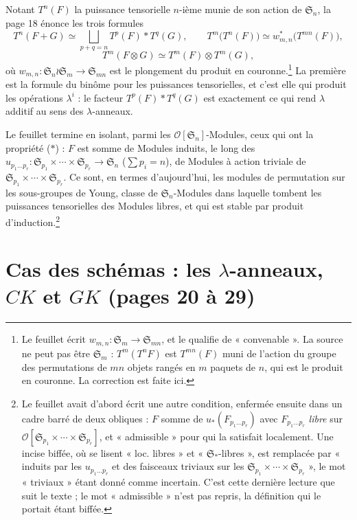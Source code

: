 \documentclass[11pt,a4paper]{article}
\begin{document}
Notant $T^{n}(F)$ la puissance tensorielle $n$-ième munie de son action de
$\mathfrak{S}_{n}$, la page 18 énonce les trois formules
\[
  T^{n}(F + G) \simeq \bigsqcup_{p+q=n} T^{p}(F) \ast T^{q}(G),
  \qquad
  T^{m}\bigl(T^{n}(F)\bigr) \simeq w_{m,n}^{*}\bigl(T^{mn}(F)\bigr),
\]
\[
  T^{m}(F \otimes G) \simeq T^{m}(F) \otimes T^{m}(G),
\]
où $w_{m,n} : \mathfrak{S}_{n} \wr \mathfrak{S}_{m} \to \mathfrak{S}_{mn}$ est
le plongement du produit en couronne.\footnote{Le feuillet écrit $w_{m,n} :
\mathfrak{S}_{m} \to \mathfrak{S}_{mn}$, et le qualifie de « convenable ». La source ne peut pas être $\mathfrak{S}_{m}$ :
$T^{m}(T^{n}F)$ est $T^{mn}(F)$ muni de l'action du groupe des permutations de
$mn$ objets rangés en $m$ paquets de $n$, qui est le produit en couronne. La
correction est faite ici.} La première est la formule du binôme pour les
puissances tensorielles, et c'est elle qui produit les opérations
$\lambda^{i}$ : le facteur $T^{p}(F) \ast T^{q}(G)$ est exactement ce qui
rend $\lambda$ additif au sens des $\lambda$-anneaux.

Le feuillet termine en isolant, parmi les $\mathcal{O}[\mathfrak{S}_{n}]$-Modules,
ceux qui ont la propriété ($\ast$) : $F$ est somme de Modules induits, le
long des $u_{p_{1} \ldots p_{r}} : \mathfrak{S}_{p_{1}} \times \cdots \times
\mathfrak{S}_{p_{r}} \to \mathfrak{S}_{n}$ ($\sum p_{i} = n$), de Modules à
action triviale de $\mathfrak{S}_{p_{1}} \times \cdots \times
\mathfrak{S}_{p_{r}}$. Ce sont, en termes d'aujourd'hui, les modules de
permutation sur les sous-groupes de Young, classe de $\mathfrak{S}_{n}$-Modules
dans laquelle tombent les puissances tensorielles des Modules libres, et qui
est stable par produit d'induction.\footnote{Le feuillet avait d'abord écrit une autre condition,
enfermée ensuite dans un cadre barré de deux obliques : $F$ somme de
$u_{*}(F_{p_{1} \ldots p_{r}})$ avec $F_{p_{1} \ldots p_{r}}$ \emph{libre} sur
$\mathcal{O}[\mathfrak{S}_{p_{1}} \times \cdots \times \mathfrak{S}_{p_{r}}]$,
et « admissible » pour qui la satisfait localement. Une incise biffée, où se
lisent « loc. libres » et « $\mathfrak{S}_{*}$-libres », est remplacée par
« induits par les $u_{p_{1} \ldots p_{r}}$ et des faisceaux triviaux sur les
$\mathfrak{S}_{p_{1}} \times \cdots \times \mathfrak{S}_{p_{r}}$ », le mot
« triviaux » étant donné comme incertain. C'est cette dernière lecture que
suit le texte ; le mot « admissible » n'est pas repris, la définition qui le
portait étant biffée.}

\section*{Cas des schémas : les $\lambda$-anneaux, $CK$ et $GK$ (pages 20 à 29)}
\end{document}
